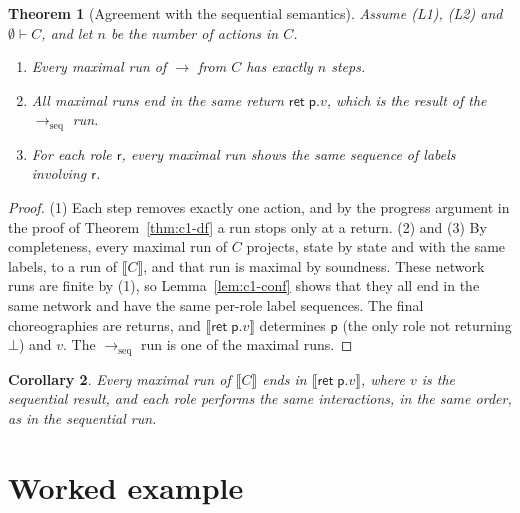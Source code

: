 \documentclass[11pt]{report}
\theoremstyle{plain}
\newtheorem{theorem}{Theorem}[chapter]
\newtheorem{corollary}[theorem]{Corollary}
\theoremstyle{definition}
\theoremstyle{remark}
\newcommand{\kw}[1]{\mathsf{#1}}
\newcommand{\pp}{\mathsf{p}}
\newcommand{\rr}{\mathsf{r}}
\newcommand{\cret}[1]{\kw{ret}\;#1}
\newcommand{\lto}[1]{\xrightarrow{\;#1\;}}
\newcommand{\seqto}{\to_{\mathrm{seq}}}
\newcommand{\projn}[1]{\llbracket #1 \rrbracket}
\begin{document}
\begin{theorem}[Agreement with the sequential semantics]\label{thm:c1-agree}
  Assume (L1), (L2) and $\emptyset\vdash C$, and let $n$ be the number of
  actions in $C$.
  \begin{enumerate}[label=(\arabic*),nosep]
  \item Every maximal run of $\lto{}$ from $C$ has exactly $n$ steps.
  \item All maximal runs end in the same return $\cret{\pp.v}$, which is the
    result of the $\seqto$ run.
  \item For each role $\rr$, every maximal run shows the same sequence of
    labels involving $\rr$.
  \end{enumerate}
\end{theorem}
\begin{proof}
  (1) Each step removes exactly one action, and by the progress argument in
  the proof of Theorem~\ref{thm:c1-df} a run stops only at a return.  (2)
  and (3) By completeness, every maximal run of $C$ projects, state by state
  and with the same labels, to a run of $\projn{C}$, and that run is maximal
  by soundness.  These network runs are finite by (1), so
  Lemma~\ref{lem:c1-conf} shows that they all end in the same network and
  have the same per-role label sequences.  The final
  choreographies are returns, and $\projn{\cret{\pp.v}}$ determines $\pp$ (the
  only role not returning $\bot$) and $v$.  The $\seqto$ run is one of the
  maximal runs.
\end{proof}

\begin{corollary}
  Every maximal run of $\projn{C}$ ends in $\projn{\cret{\pp.v}}$, where $v$
  is the sequential result, and each role performs the same interactions, in
  the same order, as in the sequential run.
\end{corollary}

\section{Worked example}
\label{sec:c1-example}
\end{document}
